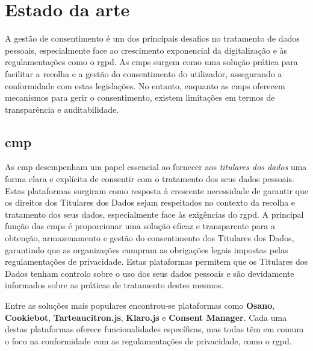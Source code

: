 \chapter{Estado da arte}

A gestão de consentimento é um dos principais desafios no tratamento de dados pessoais, especialmente face ao crescimento exponencial da digitalização e às regulamentações como o \acrshort{rgpd}. As \acrshort{cmp}s surgem como uma solução prática para facilitar a recolha e a gestão do consentimento do utilizador, assegurando a conformidade com estas legislações. No entanto, enquanto as \acrshort{cmp}s oferecem mecanismos para gerir o consentimento, existem limitações em termos de transparência e auditabilidade.


\section{\acrfull{cmp}}

As \acrfull{cmp} desempenham um papel essencial ao fornecer aos \textit{titulares dos dados} uma forma clara e explícita de consentir com o tratamento dos seus dados pessoais. Estas plataformas surgiram como resposta à crescente necessidade de garantir que os direitos dos Titulares dos Dados sejam respeitados no contexto da recolha e tratamento dos seus dados, especialmente face às exigências do \acrshort{rgpd}. A principal função das \acrshort{cmp}s é proporcionar uma solução eficaz e transparente para a obtenção, armazenamento e gestão do consentimento dos Titulares dos Dados, garantindo que as organizações cumpram as obrigações legais impostas pelas regulamentações de privacidade. Estas plataformas permitem que os Titulares dos Dados tenham controlo sobre o uso dos seus dados pessoais e são devidamente informados sobre as práticas de tratamento destes mesmos.

Entre as soluções mais populares encontrou-se plataformas como \textbf{Osano}, \textbf{Cookiebot}, \textbf{Tarteaucitron.js}, \textbf{Klaro.js} e \textbf{Consent Manager}. Cada uma destas plataformas oferece funcionalidades específicas, mas todas têm em comum o foco na conformidade com as regulamentações de privacidade, como o \acrshort{rgpd}.

